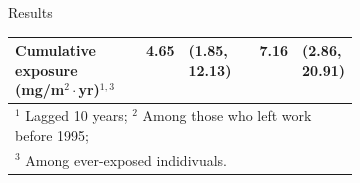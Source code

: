 \documentclass[final]{beamer}
\newlength{\onecolwid}
\begin{document}
\begin{frame}[t]
\begin{columns}[t,onlytextwidth,totalwidth=\onecolwid]
\begin{column}{\onecolwid}
\begin{block}{Results}
\begin{table}
\begin{tabular}{p{0.4\linewidth}rlcrl}
  Cumulative exposure (mg/m$^2\cdot$yr)$^{1,3}$
							& 4.65 & (1.85, 12.13) 					&  & 7.16 & (2.86, 20.91) \\
	\midrule
	\multicolumn{6}{p{0.85\linewidth}}{
	$^1$ Lagged 10 years; $^2$ Among those who left work before 1995;}\\
	\multicolumn{6}{p{0.85\linewidth}}{
	$^3$ Among ever-exposed indidivuals.}\\
   \bottomrule
	\end{tabular}
\end{table}

\vspace{1em}




\end{block}
\end{column}
\end{columns}
\end{frame}
\end{document}
